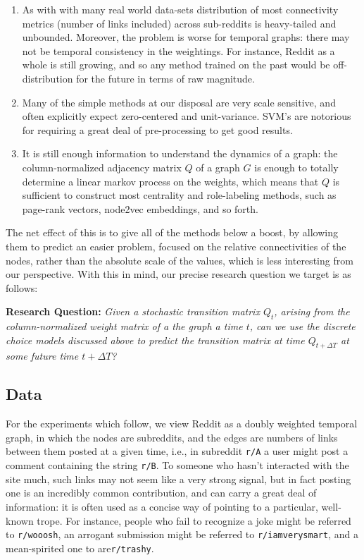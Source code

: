 \documentclass{article}
\theoremstyle{definition}
\begin{document}
	\begin{enumerate}
		\item As with with many real world data-sets distribution of most connectivity metrics (number of links included) across sub-reddits is heavy-tailed and unbounded. Moreover, the problem is worse for temporal graphs: there may not be temporal consistency in the weightings. For instance, Reddit as a whole is still growing, and so any method trained on the past would be off-distribution for the future in terms of raw magnitude.
		
		\item Many of the simple methods at our disposal are very scale sensitive, and often explicitly expect zero-centered and unit-variance. SVM's are notorious for requiring a great deal of pre-processing to get good results.
		
		
		\item It is still enough information to understand the dynamics of a graph: the column-normalized adjacency matrix $Q$ of a graph $G$ is enough to totally determine a linear markov process on the weights, which means that $Q$ is sufficient to construct most centrality and role-labeling methods, such as page-rank vectors, node2vec embeddings, and so forth.
		
	\end{enumerate}
	
	The net effect of this is to give all of the methods below a boost, by allowing them to predict an easier problem, focused on the relative connectivities of the nodes, rather than the absolute scale of the values, which is less interesting from our perspective. With this in mind, our precise research question we target is as follows:
	
	\textbf{Research Question:} \textit{ Given a stochastic transition matrix $Q_t$, arising from the column-normalized weight matrix of a the graph a time $t$, can we use the discrete choice models discussed above to predict the transition matrix at time $Q_{t + \Delta T}$ at some future time $t + \Delta T$? }
	
	
	\subsection{Data}
	For the experiments which follow, we view Reddit as a doubly weighted temporal graph, in which the nodes are subreddits, and the edges are numbers of links between them posted at a given time, i.e., in subreddit \texttt{r/A} a user might post a comment containing the string \texttt{r/B}. To someone who hasn't interacted with the site much, such links may  not seem like a very strong signal, but in fact posting one is an incredibly common contribution, and can carry a great deal of information: it is often used as a concise way of pointing to a particular, well-known trope. For instance, people who fail to recognize a joke might be referred to \texttt{r/wooosh}, an arrogant submission might be referred to \texttt{r/iamverysmart}, and a mean-spirited one to are\texttt{r/trashy}. 
	
\end{document}
